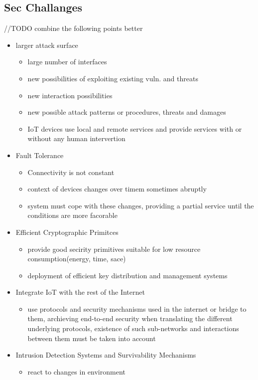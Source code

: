 \documentclass[a4paper, 12pt]{article}
\begin{document}
\subsection{Sec Challanges}
//TODO combine the following points better
\begin{itemize}
\item larger attack surface
\begin{itemize}
\item large number of interfaces
\item new possibilities of exploiting existing vuln. and threats
\item new interaction possibilities
\item new possible attack patterns or procedures, threats and damages
\item IoT devices use local and remote services and provide services with or without any human intervertion
\end{itemize}
\item Fault Tolerance
\begin{itemize}
\item Connectivity is not constant
\item context of devices changes over timem sometimes abruptly
\item system must cope with these changes, providing a partial service until the conditions are more facorable
\end{itemize}
\item Efficient Cryptographic Primitces
\begin{itemize}
\item provide good secirity primitives suitable for low resource consumption(energy, time, sace)
\item deployment of efficient key distribution and management systems
\end{itemize}
\item Integrate IoT with the rest of the Internet
\begin{itemize}
\item use protocols and security mechanisms used in the internet or bridge to them, archieving end-to-end security when translating the different underlying protocols, existence of such sub-networks and interactions between them must be taken into account
\end{itemize}
\item Intrusion Detection Systems and Survivability Mechanisms
\begin{itemize}
\item react to changes in environment

\end{itemize}
\end{itemize}
\end{document}
